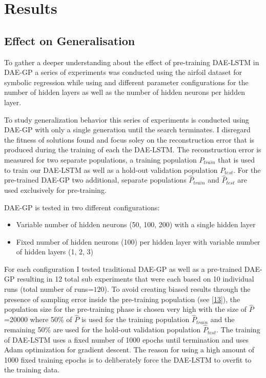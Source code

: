 \documentclass[
  11pt,
]{article}
\providecommand{\tightlist}{%
  \setlength{\itemsep}{0pt}\setlength{\parskip}{0pt}}
\begin{document}
\hypertarget{results}{%
\section{Results}\label{results}}

\hypertarget{effect-on-generalisation}{%
\subsection{Effect on Generalisation}\label{effect-on-generalisation}}

To gather a deeper understanding about the effect of pre-training
DAE-LSTM in DAE-GP a series of experiments was conducted using the
airfoil dataset for symbolic regression while using and different
parameter configurations for the number of hidden layers as well as the
number of hidden neurons per hidden layer.

To study generalization behavior this series of experiments is conducted
using DAE-GP with only a single generation until the search terminates.
I disregard the fitness of solutions found and focus soley on the
reconstruction error that is produced during the training of each the
DAE-LSTM. The reconstruction error is measured for two separate
populations, a training population \(P_{train}\) that is used to train
our DAE-LSTM as well as a hold-out validation population \(P_{test}\).
For the pre-trained DAE-GP two additional, separate populations
\(\hat{P}_{train}\) and \(\hat{P}_{test}\) are used exclusively for
pre-training.

DAE-GP is tested in two different configurations:

\begin{itemize}
\tightlist
\item
  Variable number of hidden neurons (50, 100, 200) with a single hidden
  layer
\item
  Fixed number of hidden neurons (100) per hidden layer with variable
  number of hidden layers (1, 2, 3)
\end{itemize}

For each configuration I tested traditional DAE-GP as well as a
pre-trained DAE-GP resulting in 12 total sub experiments that were each
based on 10 individual runs (total number of runs=\(120\)). To avoid
creating biased results through the presence of sampling error inside
the pre-training population (see
{[}\protect\hyperlink{ref-sampling_err_gp}{13}{]}), the population size
for the pre-training phase is chosen very high with the size of
\(\hat{P}\) =20000 where 50\% of \(\hat{P}\) is used for the training
population \(\hat{P}_{train}\) and the remaining 50\% are used for the
hold-out validation population \(\hat{P}_{test}\). The training of
DAE-LSTM uses a fixed number of 1000 epochs until termination and uses
Adam optimization for gradient descent. The reason for using a high
amount of 1000 fixed training epochs is to deliberately force the
DAE-LSTM to overfit to the training data.
\end{document}
